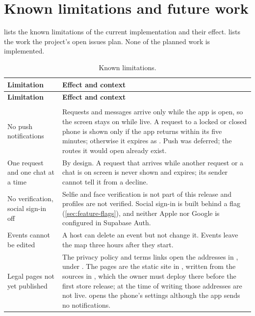 \chapter{Known limitations and future work}
\label{ch:limitations}

 lists the known limitations of the current implementation and their effect.
 lists the work the project's open issues plan. None of the planned work is
implemented.

\begingroup\tablefont
\begin{longtable}{@{}L{38mm}L{\dimexpr\linewidth-38mm-2\tabcolsep\relax}@{}}
  \caption{Known limitations.}
  \label{tab:limitations}\\
  \toprule
  \textsf{\textbf{Limitation}} & \textsf{\textbf{Effect and context}} \\
  \midrule
  \endfirsthead
  \toprule
  \textsf{\textbf{Limitation}} & \textsf{\textbf{Effect and context}} \\
  \midrule
  \endhead
  \bottomrule
  \endfoot
   \\
  No push notifications & Requests and messages arrive only while the app is open, so the screen stays on while live. A request to a locked or closed phone is shown only if the app returns within its five minutes; otherwise it expires as . Push was deferred; the routes it would open already exist. \\
  One request and one chat at a time & By design. A request that arrives while another request or a chat is on screen is never shown and expires; its sender cannot tell it from a decline. \\
  No verification, social sign-in off & Selfie and face verification is not part of this release and profiles are not verified. Social sign-in is built behind a flag (\cref{sec:feature-flags}), and neither Apple nor Google is configured in Supabase Auth. \\
  Events cannot be edited & A host can delete an event but not change it. Events leave the map three hours after they start. \\
  Legal pages not yet published & The privacy policy and terms links open the addresses in , under . The pages are the static site in , written from the sources in , which the owner must deploy there before the first store release; at the time of writing those addresses are not live.  opens the phone's settings although the app sends no notifications. \\

\end{longtable}
